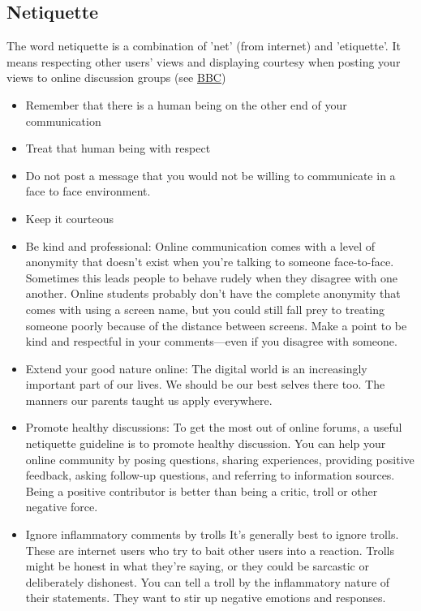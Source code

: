 \documentclass{article}
\begin{document}
 \subsection{Netiquette}
 The word netiquette is a combination of ’net’ (from internet) and ’etiquette’. It means respecting other users’ views and displaying 
 courtesy when posting your views to online discussion groups (see \href{https://www.bbc.co.uk/webwise/guides/about-netiquette}{BBC})
 \begin{itemize}
    \item Remember that there is a human being on the other end of your communication
    \item Treat that human being with respect
    \item Do not post a message that you would not be willing to communicate in a face to face environment.
    \item Keep it courteous
    \item Be kind and professional:  Online communication comes with a level of anonymity that doesn’t exist when you’re talking to someone face-to-face. 
    Sometimes this leads people to behave rudely when they disagree with one another. Online students probably don’t have the complete anonymity that comes with using a screen name, but you could still fall prey to treating someone poorly because of the distance between screens. Make a point to be kind and respectful in your comments—even if you disagree with someone.
    \item Extend your good nature online: The digital world is an increasingly important part of our lives. We should be our best selves there too. The manners our parents taught us apply everywhere.
    \item Promote healthy discussions: 
    To get the most out of online forums, a useful netiquette guideline is to promote healthy discussion. You can help your online community by posing questions, sharing experiences, providing positive feedback, asking follow-up questions, and referring to information sources. Being a positive contributor is better than being a critic, troll or other negative force.
    \item Ignore inflammatory comments by trolls
    It's generally best to ignore trolls. These are internet users who try to bait other users into a reaction. Trolls might be honest in what they're saying, or they could be sarcastic or deliberately dishonest. You can tell a troll by the inflammatory nature of their statements. They want to stir up negative emotions and responses.

\end{itemize}
\end{document}
